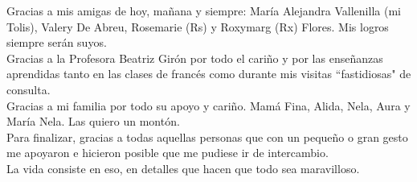 Gracias a mis amigas de hoy, mañana y siempre: María Alejandra Vallenilla (mi Tolis), Valery De Abreu, Rosemarie (Rs) y Roxymarg (Rx) Flores. Mis logros siempre serán suyos. \\ 

Gracias a la Profesora Beatriz Girón por todo el cariño y por las enseñanzas aprendidas tanto en las clases de francés como durante mis visitas ``fastidiosas" de consulta. \\

Gracias a mi familia por todo su apoyo y cariño. Mamá Fina, Alida, Nela, Aura y María Nela. Las quiero un montón. \\

Para finalizar, gracias a todas aquellas personas que con un pequeño o gran gesto me apoyaron e hicieron posible que me pudiese ir de intercambio. \\

La vida consiste en eso, en detalles que hacen que todo sea maravilloso. \\

\bigskip
